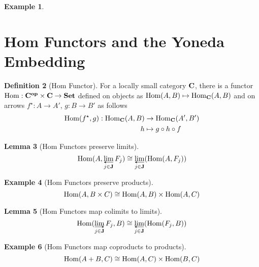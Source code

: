 \documentclass{scrartcl}
\theoremstyle{definition}
\newtheorem{definition}{Definition}[section]
\newtheorem{lemma}[definition]{Lemma}
\newtheorem{example}[definition]{Example}
\begin{document}
\begin{example}
\begin{center}
\end{center}
\end{example}

\section{Hom Functors and the Yoneda Embedding}
\label{sec:homfunctors}

\begin{definition}[Hom Functor]
  For a locally small category $\mathbf{C}$, there is a functor $\mathrm{Hom}: \mathbf{C}^{\mathbf{op}} \times \mathbf{C} \rightarrow \mathbf{Set}$ defined on objects as $\mathrm{Hom}(A,B) \mapsto \mathrm{Hom}_{\mathbf{C}}(A,B)$ and on arrows $f^\star : A \rightarrow A'$, $g: B \rightarrow B'$ as follows
  \begin{align*}
    \mathrm{Hom}(f^\star,g) : \mathrm{Hom}_{\mathbf{C}}(A,B) & \rightarrow \mathrm{Hom}_{\mathbf{C}}(A',B') \\
    h &\mapsto g \circ h \circ f
  \end{align*}
\end{definition}

\begin{lemma}[Hom Functors preserve limits]
  \label{lem:hompreserveslimits}
  $$\mathrm{Hom}(A,\lim{j \in \Cat{J}}F_j) \iso \lim{j \in \Cat{J}}(\mathrm{Hom}(A,F_j))$$
\end{lemma}

\begin{example}[Hom Functors preserve products]
  $$\mathrm{Hom}(A,B \times C) \cong \mathrm{Hom}(A,B) \times \mathrm{Hom}(A,C)$$
\end{example}

\begin{lemma}[Hom Functors map colimits to limits]
  \label{lem:hompreservescolimits}
  $$\mathrm{Hom}(\colim{j \in \Cat{J}}F_j,B) \iso \lim{j \in \Cat{J}}(\mathrm{Hom}(F_j,B))$$
\end{lemma}

\begin{example}[Hom Functors map coproducts to products]
  $$\mathrm{Hom}(A + B, C) \cong \mathrm{Hom}(A,C) \times \mathrm{Hom}(B,C)$$
\end{example}
\end{document}
